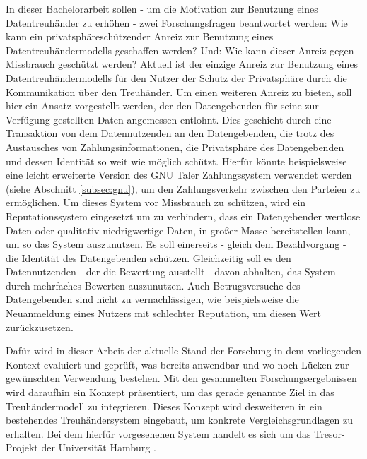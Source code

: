\documentclass{scrreprt}
\begin{document}
In dieser Bachelorarbeit sollen - um die Motivation zur Benutzung eines Datentreuhänder zu erhöhen - zwei Forschungsfragen beantwortet werden: Wie kann ein privatsphäreschützender Anreiz zur Benutzung eines Datentreuhändermodells geschaffen werden? Und: Wie kann dieser Anreiz gegen Missbrauch geschützt werden? Aktuell ist der einzige Anreiz zur Benutzung eines Datentreuhändermodells für den Nutzer der Schutz der Privatsphäre durch die Kommunikation über den Treuhänder. Um einen weiteren Anreiz zu bieten, soll hier ein Ansatz vorgestellt werden, der den Datengebenden für seine zur Verfügung gestellten Daten angemessen entlohnt. Dies geschieht durch eine Transaktion von dem Datennutzenden an den Datengebenden, die trotz des Austausches von Zahlungsinformationen, die Privatsphäre des Datengebenden und dessen Identität so weit wie möglich schützt. Hierfür könnte beispielsweise eine leicht erweiterte Version des GNU Taler Zahlungssystem verwendet werden (siehe Abschnitt \ref{subsec:gnu}), um den Zahlungsverkehr zwischen den Parteien zu ermöglichen. Um dieses System vor Missbrauch zu schützen, wird ein Reputationssystem eingesetzt um zu verhindern, dass ein Datengebender wertlose Daten oder qualitativ niedrigwertige Daten, in großer Masse bereitstellen kann, um so das System auszunutzen. Es soll einerseits - gleich dem Bezahlvorgang - die Identität des Datengebenden schützen. Gleichzeitig soll es den Datennutzenden - der die Bewertung ausstellt - davon abhalten, das System durch mehrfaches Bewerten auszunutzen. Auch Betrugsversuche des Datengebenden sind nicht zu vernachlässigen, wie beispielsweise die Neuanmeldung eines Nutzers mit schlechter Reputation, um diesen Wert zurückzusetzen.

Dafür wird in dieser Arbeit der aktuelle Stand der Forschung in dem vorliegenden Kontext evaluiert und geprüft, was bereits anwendbar und wo noch Lücken zur gewünschten Verwendung bestehen. Mit den gesammelten Forschungsergebnissen wird daraufhin ein Konzept präsentiert, um das gerade genannte Ziel in das Treuhändermodell zu integrieren. Dieses Konzept wird desweiteren in ein bestehendes Treuhändersystem eingebaut, um konkrete Vergleichsgrundlagen zu erhalten. Bei dem hierfür vorgesehenen System handelt es sich um das Tresor-Projekt der Universität Hamburg \cite{TRESOR}.


\end{document}
